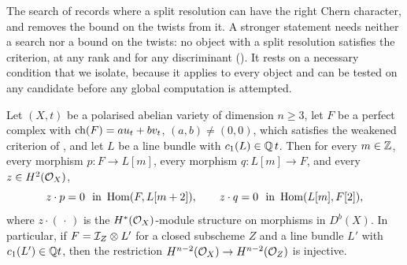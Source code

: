 The search of  records where a split resolution can
have the right Chern character, and  removes the
bound on the twists from it. A stronger statement needs neither a search
nor a bound on the twists: no object with a split resolution satisfies the
criterion, at any rank and for any discriminant (). It
rests on a necessary condition that we isolate, because it applies to
every object and can be tested on any candidate before any global
computation is attempted.

\begin{lemma}
\label{lem:annihilation}
Let $(X,t)$ be a polarised abelian variety of dimension $n\ge3$, let $F$ be
a perfect complex with $\operatorname{ch}(F)=au_{t}+bv_{t}$, $(a,b)\ne(0,0)$, which
satisfies the weakened criterion of , and let $L$ be a
line bundle with $c_{1}(L)\in\mathbb{Q}\,t$. Then for every $m\in\mathbb{Z}$, every
morphism $p\colon F\to L[m]$, every morphism $q\colon L[m]\to F$, and every
$z\in H^{2}(\mathcal{O}_{X})$,
\[
  z\cdot p=0\ \ \text{in }\operatorname{Hom}(F,L[m+2]),\qquad
  z\cdot q=0\ \ \text{in }\operatorname{Hom}(L[m],F[2]),
\]
where $z\cdot(\,\cdot\,)$ is the $H^{*}(\mathcal{O}_{X})$-module structure on
morphisms in $D^{b}(X)$. In particular, if $F=\mathcal{I}_{Z}\otimes L'$ for a closed
subscheme $Z$ and a line bundle $L'$ with $c_{1}(L')\in\mathbb{Q} t$, then the
restriction $H^{n-2}(\mathcal{O}_{X})\to H^{n-2}(\mathcal{O}_{Z})$ is injective.
\end{lemma}

